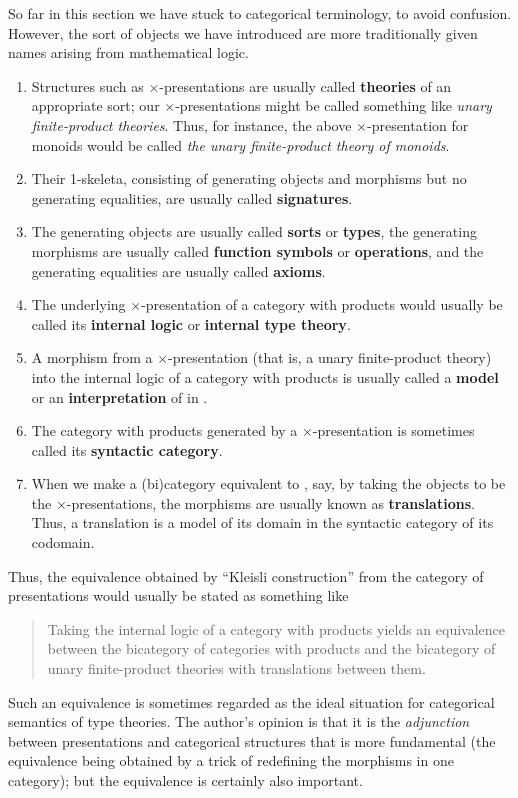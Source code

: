 So far in this section we have stuck to categorical terminology, to avoid confusion.
However, the sort of objects we have introduced are more traditionally given names arising from mathematical logic.
\begin{enumerate}
\item Structures such as $\times$-presentations are usually called \textbf{theories} of an appropriate sort; our $\times$-presentations might be called something like \emph{unary finite-product theories}.
  Thus, for instance, the above $\times$-presentation for monoids would be called \emph{the unary finite-product theory of monoids}.
\item Their 1-skeleta, consisting of generating objects and morphisms but no generating equalities, are usually called \textbf{signatures}.
\item The generating objects are usually called \textbf{sorts} or \textbf{types}, the generating morphisms are usually called \textbf{function symbols} or \textbf{operations}, and the generating equalities are usually called \textbf{axioms}.
\item The underlying $\times$-presentation of a category with products would usually be called its \textbf{internal logic} or \textbf{internal type theory}.
\item A morphism from a $\times$-presentation \cP (that is, a unary finite-product theory) into the internal logic of a category with products \cM is usually called a \textbf{model} or an \textbf{interpretation} of \cP in \cM.
\item The category with products generated by a $\times$-presentation is sometimes called its \textbf{syntactic category}.
\item When we make a (bi)category equivalent to \bPrCat, say, by taking the objects to be the $\times$-presentations, the morphisms are usually known as \textbf{translations}.
  Thus, a translation is a model of its domain in the syntactic category of its codomain.
\end{enumerate}

Thus, the equivalence obtained by ``Kleisli construction'' from the category of presentations would usually be stated as something like
\begin{quote}
  Taking the internal logic of a category with products yields an equivalence between the bicategory of categories with products and the bicategory of unary finite-product theories with translations between them.
\end{quote}
Such an equivalence is sometimes regarded as the ideal situation for categorical semantics of type theories.
The author's opinion is that it is the \emph{adjunction} between presentations and categorical structures that is more fundamental (the equivalence being obtained by a trick of redefining the morphisms in one category); but the equivalence is certainly also important.

